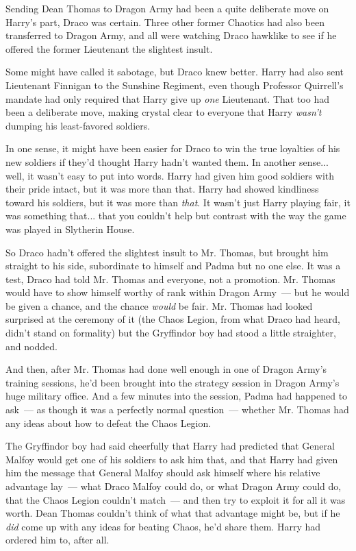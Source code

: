 Sending Dean Thomas to Dragon Army had been a quite deliberate move on Harry's part, Draco was certain. Three other former Chaotics had also been transferred to Dragon Army, and all were watching Draco hawklike to see if he offered the former Lieutenant the slightest insult.

Some might have called it sabotage, but Draco knew better. Harry had also sent Lieutenant Finnigan to the Sunshine Regiment, even though Professor Quirrell's mandate had only required that Harry give up \emph{one} Lieutenant. That too had been a deliberate move, making crystal clear to everyone that Harry \emph{wasn't} dumping his least-favored soldiers.

In one sense, it might have been easier for Draco to win the true loyalties of his new soldiers if they'd thought Harry hadn't wanted them. In another sense... well, it wasn't easy to put into words. Harry had given him good soldiers with their pride intact, but it was more than that. Harry had showed kindliness toward his soldiers, but it was more than \emph{that}. It wasn't just Harry playing fair, it was something that... that you couldn't help but contrast with the way the game was played in Slytherin House.

So Draco hadn't offered the slightest insult to Mr. Thomas, but brought him straight to his side, subordinate to himself and Padma but no one else. It was a test, Draco had told Mr. Thomas and everyone, not a promotion. Mr. Thomas would have to show himself worthy of rank within Dragon Army~--- but he would be given a chance, and the chance \emph{would} be fair. Mr. Thomas had looked surprised at the ceremony of it (the Chaos Legion, from what Draco had heard, didn't stand on formality) but the Gryffindor boy had stood a little straighter, and nodded.

And then, after Mr. Thomas had done well enough in one of Dragon Army's training sessions, he'd been brought into the strategy session in Dragon Army's huge military office. And a few minutes into the session, Padma had happened to ask~--- as though it was a perfectly normal question~--- whether Mr. Thomas had any ideas about how to defeat the Chaos Legion.

The Gryffindor boy had said cheerfully that Harry had predicted that General Malfoy would get one of his soldiers to ask him that, and that Harry had given him the message that General Malfoy should ask himself where his relative advantage lay~--- what Draco Malfoy could do, or what Dragon Army could do, that the Chaos Legion couldn't match~--- and then try to exploit it for all it was worth. Dean Thomas couldn't think of what that advantage might be, but if he \emph{did} come up with any ideas for beating Chaos, he'd share them. Harry had ordered him to, after all.

